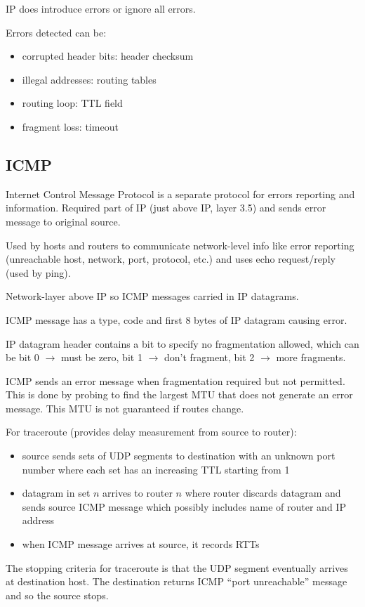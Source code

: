 \documentclass[11pt]{article}
\begin{document}
IP does introduce errors or ignore all errors.

Errors detected can be:
\begin{itemize}
\item corrupted header bits: header checksum
\item illegal addresses: routing tables
\item routing loop: TTL field
\item fragment loss: timeout
\end{itemize}
\subsection{ICMP}
\label{sec:org24376e3}
Internet Control Message Protocol is a separate protocol for errors reporting and
information.
Required part of IP (just above IP, layer 3.5) and sends error message to
original source.

Used by hosts and routers to communicate network-level info like error reporting
(unreachable host, network, port, protocol, etc.) and uses echo request/reply (used
by ping).

Network-layer above IP so ICMP messages carried in IP datagrams.

ICMP message has a type, code and first 8 bytes of IP datagram causing error.

IP datagram header contains a bit to specify no fragmentation allowed, which can be
bit 0 \(\to\) must be zero, bit 1 \(\to\) don't fragment, bit 2 \(\to\) more fragments.

ICMP sends an error message when fragmentation required but not permitted.
This is done by probing to find the largest MTU that does not generate an error
message.
This MTU is not guaranteed if routes change.

For traceroute (provides delay measurement from source to router):
\begin{itemize}
\item source sends sets of UDP segments to destination with an unknown port number
where each set has an increasing TTL starting from 1
\item datagram in set \(n\) arrives to router \(n\) where router discards datagram
and sends source ICMP message which possibly includes name of router
and IP address
\item when ICMP message arrives at source, it records RTTs
\end{itemize}

The stopping criteria for traceroute is that the UDP segment eventually arrives
at destination host.
The destination returns ICMP ``port unreachable'' message and so the source stops.
\end{document}
